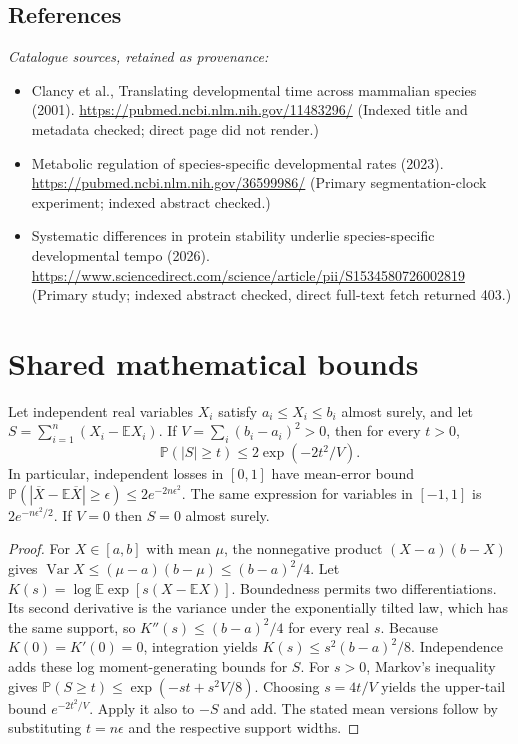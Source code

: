 \documentclass[11pt]{article}
\begin{document}
\subsection{References}
\noindent\emph{Catalogue sources, retained as provenance:}
\begin{itemize}
\item Clancy et al., Translating developmental time across mammalian species (2001). \url{https://pubmed.ncbi.nlm.nih.gov/11483296/} (Indexed title and metadata checked; direct page did not render.)
\item Metabolic regulation of species-specific developmental rates (2023). \url{https://pubmed.ncbi.nlm.nih.gov/36599986/} (Primary segmentation-clock experiment; indexed abstract checked.)
\item Systematic differences in protein stability underlie species-specific developmental tempo (2026). \url{https://www.sciencedirect.com/science/article/pii/S1534580726002819} (Primary study; indexed abstract checked, direct full-text fetch returned 403.)
\end{itemize}




\section{Shared mathematical bounds}\label{app:bounds}
\begin{lemma}\label{lem:bounded}
Let independent real variables $X_i$ satisfy $a_i\leq X_i\leq b_i$ almost surely,
and let $S=\sum_{i=1}^n(X_i-\mathbb{E} X_i)$. If
$V=\sum_i(b_i-a_i)^2>0$, then for every $t>0$,
\[
 \mathbb{P}(|S|\geq t)\leq 2\exp(-2t^2/V).
\]
In particular, independent losses in $[0,1]$ have mean-error bound
$\mathbb{P}(|\overline X-\mathbb{E}\overline X|\geq\epsilon)
\leq2e^{-2n\epsilon^2}$. The same expression for variables in $[-1,1]$
is $2e^{-n\epsilon^2/2}$. If $V=0$ then $S=0$ almost surely.
\end{lemma}
\begin{proof}
For $X\in[a,b]$ with mean $\mu$, the nonnegative product
$(X-a)(b-X)$ gives
$\operatorname{Var} X\leq(\mu-a)(b-\mu)\leq(b-a)^2/4$.
Let $K(s)=\log\mathbb{E}\exp[s(X-\mathbb{E} X)]$.
Boundedness permits two differentiations. Its second derivative is the variance
under the exponentially tilted law, which has the same support, so
$K''(s)\leq(b-a)^2/4$ for every real $s$.
Because $K(0)=K'(0)=0$, integration yields
$K(s)\leq s^2(b-a)^2/8$.
Independence adds these log moment-generating bounds for $S$.
For $s>0$, Markov's inequality gives
$\mathbb{P}(S\geq t)\leq\exp(-st+s^2V/8)$.
Choosing $s=4t/V$ yields the upper-tail bound $e^{-2t^2/V}$.
Apply it also to $-S$ and add. The stated mean versions follow by substituting
$t=n\epsilon$ and the respective support widths.
\end{proof}
\end{document}
